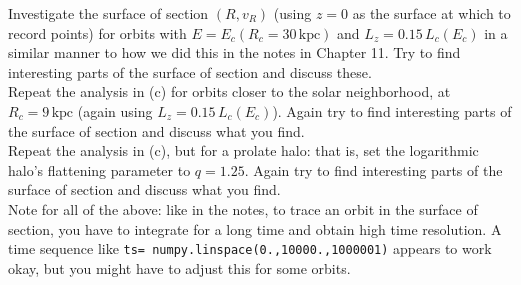 \documentclass[12pt]{article}
\begin{document}
 Investigate the surface of section $(R,v_R)$ (using
$z=0$ as the surface at which to record points) for orbits with $E =
E_c(R_c = 30\,\mathrm{kpc})$ and $L_z = 0.15\,L_c(E_c)$ in a similar
manner to how we did this in the notes in Chapter 11. Try to find
interesting parts of the surface of section and discuss these.\\

 Repeat the analysis in (c) for orbits closer to the
solar neighborhood, at $R_c=9\,\mathrm{kpc}$ (again using $L_z =
0.15\,L_c(E_c)$). Again try to find interesting parts of the surface
of section and discuss what you find.\\

 Repeat the analysis in (c), but for a prolate halo:
that is, set the logarithmic halo's flattening parameter to $q=1.25$.
Again try to find interesting parts of the surface of section and
discuss what you find.\\

Note for all of the above: like in the notes, to trace an orbit in the
surface of section, you have to integrate for a long time and obtain
high time resolution. A time sequence like \texttt{ts=
  numpy.linspace(0.,10000.,1000001)} appears to work okay, but you
might have to adjust this for some orbits.
\end{document}
